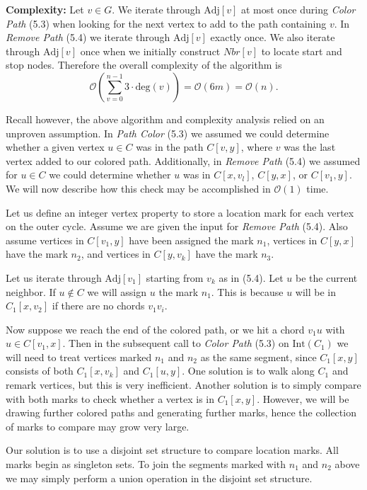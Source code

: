 \documentclass[letterpaper, 12pt]{article}
\theoremstyle{definition}
\theoremstyle{definition}
\theoremstyle{thm}
\theoremstyle{definition}
\begin{document}
\noindent\textbf{Complexity:} Let $v\in G$. We iterate through $\text{Adj}[v]$
at most once during \textit{Color Path} (5.3) when looking for the next vertex
to add to the path containing $v$. In \textit{Remove Path} (5.4) we iterate through
$\text{Adj}[v]$ exactly once. We also iterate through $\text{Adj}[v]$ once
when we initially construct $\textit{Nbr}[v]$ to locate start and stop nodes.
Therefore the overall complexity of the algorithm is
\[
    \mathcal{O}\left(\sum_{v=0}^{n-1}3\cdot\text{deg}(v)\right)
        =\mathcal{O}(6m)=\mathcal{O}(n).
\]

Recall however, the above algorithm and complexity analysis relied on an
unproven assumption. In \textit{Path Color} (5.3) we assumed we could determine
whether a given vertex $u\in C$ was in the path $C[v,y]$, where $v$ was the
last vertex added to our colored path. Additionally, in \textit{Remove Path}
(5.4) we assumed for $u\in C$ we could determine whether $u$ was in $C[x,v_l]$,
$C[y,x]$, or $C[v_1,y]$. We will now describe how this check may be accomplished
in $\mathcal{O}(1)$ time.

Let us define an integer vertex property to store a location mark for each
vertex on the outer cycle. Assume we are given the input for \textit{Remove
Path} (5.4). Also assume vertices in $C[v_1,y]$ have been assigned the mark $n_1$,
vertices in $C[y,x]$ have the mark $n_2$, and vertices in $C[y,v_k]$ have
the mark $n_3$.

Let us iterate through $\text{Adj}[v_1]$ starting from $v_k$ as in (5.4). Let
$u$ be the current neighbor. If $u\not\in C$ we will assign $u$ the mark $n_1$.
This is because $u$ will be in $C_1[x,v_2]$ if there are no chords $v_1v_i$.

Now suppose we reach the end of the colored path, or we hit a chord $v_1u$ with
$u\in C[v_1,x]$. Then in the subsequent call to \textit{Color Path} (5.3) on
$\text{Int}(C_1)$ we will need to treat vertices marked $n_1$ and $n_2$ as the
same segment, since $C_1[x,y]$ consists of both $C_1[x,v_k]$ and $C_1[u,y]$.
One solution is to walk along $C_1$ and remark vertices, but this is very
inefficient. Another solution is to simply compare with both marks to check
whether a vertex is in $C_1[x,y]$. However, we will be drawing further colored
paths and generating further marks, hence the collection of marks to compare
may grow very large.

Our solution is to use a disjoint set structure to compare location marks. All
marks begin as singleton sets. To join the segments marked with $n_1$ and
$n_2$ above we may simply perform a union operation in the disjoint set structure.
\end{document}
